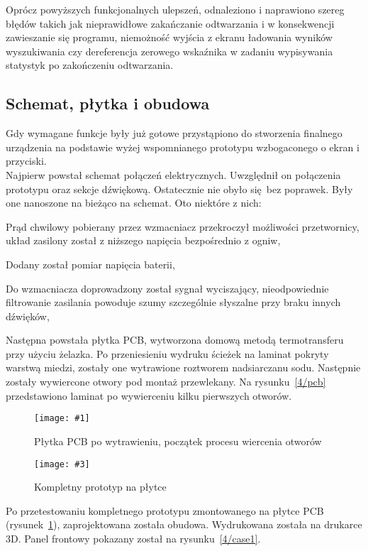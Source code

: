 \documentclass[12pt]{report}
\let\tempone\itemize
\let\temptwo\enditemize
\renewenvironment{itemize}{\tempone\setlength{\itemsep}{0cm}}{\temptwo}
\newcommand{\imgintss}[5]{
	\begin{figure}[{#5}]
		\centering
		\begin{minipage}{.45\textwidth}
			\centering
			\texttt{[image: \#1]}
			\caption{#2}
			\label{#1}
		\end{minipage}%
		\hfill
		\begin{minipage}{.45\textwidth}
			\centering
			\texttt{[image: \#3]}
			\caption{#4}
			\label{#3}
		\end{minipage}
	\end{figure}
}
\newcommand{\imghss}[4]{\imgintss{#1}{#2}{#3}{#4}{H}}
\begin{document}
			Oprócz powyższych funkcjonalnych ulepszeń, odnaleziono i naprawiono szereg błędów takich jak nieprawidłowe zakańczanie odtwarzania i w konsekwencji zawieszanie się programu, niemożność wyjścia z ekranu ładowania wyników wyszukiwania czy dereferencja zerowego wskaźnika w zadaniu wypisywania statystyk po zakończeniu odtwarzania.
			
		\subsection{Schemat, płytka i obudowa}
			Gdy wymagane funkcje były już gotowe przystąpiono do stworzenia finalnego urządzenia na podstawie wyżej wspomnianego prototypu wzbogaconego o ekran i przyciski.
			$ $\\
			
			Najpierw powstał schemat połączeń elektrycznych. Uwzględnił on połączenia prototypu oraz sekcje dźwiękową. Ostatecznie nie obyło się bez poprawek. Były one nanoszone na bieżąco na schemat. Oto niektóre z nich:
			\begin{itemize}
				\item Prąd chwilowy pobierany przez wzmacniacz przekroczył możliwości przetwornicy, układ zasilony został z niższego napięcia bezpośrednio z ogniw,
				\item Dodany został pomiar napięcia baterii,
				\item Do wzmacniacza doprowadzony został sygnał wyciszający, nieodpowiednie filtrowanie zasilania powoduje szumy szczególnie słyszalne przy braku innych dźwięków,
			\end{itemize}
			
			Następna powstała płytka PCB, wytworzona domową metodą termotransferu przy użyciu żelazka\textsuperscript{\cite{ch4_pcb_method}}. Po przeniesieniu wydruku ścieżek na laminat pokryty warstwą miedzi, zostały one wytrawione roztworem nadsiarczanu sodu. Następnie zostały wywiercone otwory pod montaż przewlekany. Na rysunku~\ref{4/pcb} przedstawiono laminat po wywierceniu kilku pierwszych otworów.
			
			\imghss{4/pcb}{Płytka PCB po wytrawieniu, początek procesu wiercenia otworów}{4/prototype_3}{Kompletny prototyp na płytce}
			
			Po przetestowaniu kompletnego prototypu zmontowanego na płytce PCB (rysunek~\ref{4/prototype_3}), zaprojektowana została obudowa. Wydrukowana została na drukarce 3D. Panel frontowy pokazany został na rysunku~\ref{4/case1}.
			$ $\\
			
\end{document}
